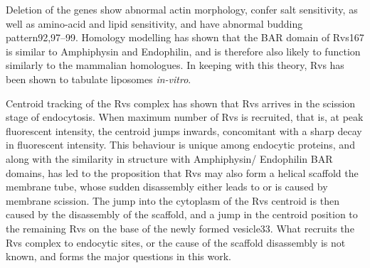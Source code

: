 		\vspace{5mm}
		Deletion of the genes show abnormal actin morphology, confer salt sensitivity, as well as amino-acid and lipid sensitivity, and have abnormal budding pattern92,97–99. Homology modelling has shown that the BAR domain of Rvs167 is similar to Amphiphysin and Endophilin, and is therefore also likely to function similarly to the mammalian homologues. In keeping with this theory, Rvs has been shown to tabulate liposomes \textit{in-vitro}. 
		
		\vspace{5mm}
		Centroid tracking of the Rvs complex has shown that Rvs arrives in the scission stage of endocytosis. When maximum number of Rvs is recruited, that is, at peak fluorescent intensity, the centroid jumps inwards, concomitant with a sharp decay in fluorescent intensity. This behaviour is unique among endocytic proteins, and along with the similarity in structure with Amphiphysin/ Endophilin BAR domains, has led to the proposition that Rvs may also form a helical scaffold the membrane tube, whose sudden disassembly either leads to or is caused by membrane scission. The jump into the cytoplasm of the Rvs centroid is then caused by the disassembly of the scaffold, and a jump in the centroid position to the remaining Rvs on the base of the newly formed vesicle33. What recruits the Rvs complex to endocytic sites, or the cause of the scaffold disassembly is not known, and forms the major questions in this work.

		

